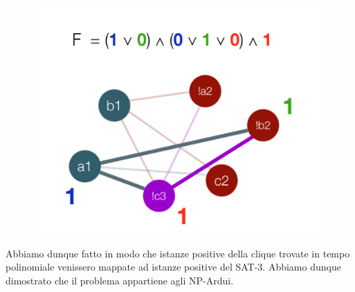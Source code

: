 \documentclass{article}
\begin{document}
\begin{enumerate}
    \begin{figure}[htbp]
        \center
        \includegraphics[scale=0.5]{img/map3.png}
    \end{figure}

    Abbiamo dunque fatto in modo che istanze positive della clique trovate in tempo polinomiale venissero mappate ad istanze positive del SAT-3. Abbiamo dunque dimostrato che il problema appartiene agli NP-Ardui.
    
\end{enumerate}

\newpage
\end{document}
